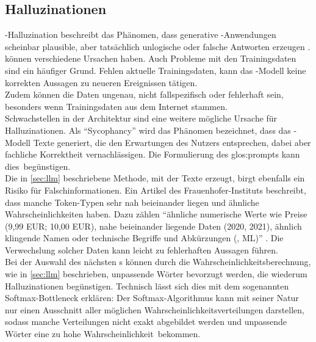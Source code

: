 \documentclass[../main.tex]{subfiles}
\begin{document}
\subsection{Halluzinationen}
 -Halluzination beschreibt 
das Phänomen, dass generative -Anwendungen scheinbar plausible, aber tatsächlich unlogische oder falsche Antworten erzeugen \cite{hallucinationForewarning}.\\
 können verschiedene Ursachen haben. Auch Probleme mit den Trainingsdaten sind ein häufiger Grund. Fehlen aktuelle Trainingsdaten, kann das -Modell keine korrekten Aussagen zu neueren Ereignissen tätigen.\\ 
Zudem können die Daten ungenau, nicht fallspezifisch oder fehlerhaft sein, besonders wenn Trainingsdaten aus dem Internet stammen.\\ 
Schwachstellen in der Architektur sind eine weitere mögliche Ursache für Halluzinationen. Als "`Sycophancy"' wird das Phänomen bezeichnet, dass das -Modell Texte 
generiert, die den Erwartungen des Nutzers entsprechen, dabei aber fachliche Korrektheit vernachlässigen. Die Formulierung des \gls{glos:prompt}s kann \mbox{dies begünstigen. \cite{allgemHalluzinationen}} \\
Die in \autoref{sec:llm} beschriebene Methode, mit der  Texte erzeugt, birgt ebenfalls ein Risiko für Falschinformationen. Ein Artikel des Frauenhofer-Instituts beschreibt, dass manche Token-Typen sehr nah beieinander liegen 
und ähnliche Wahrscheinlichkeiten haben. Dazu zählen "`ähnliche numerische Werte wie Preise (9,99 EUR; 10,00 EUR), nahe beieinander liegende Daten (2020, 2021), ähnlich klingende Namen oder 
technische Begriffe und Abkürzungen (, ML)"' \cite{halluzinationenFraunhofer}. Die Verwechslung solcher Daten kann leicht zu fehlerhaften Aussagen führen.\\
Bei der Auswahl des nächsten s können durch die Wahrscheinlichkeitsberechnung, wie in \autoref{sec:llm}  beschrieben, unpassende Wörter bevorzugt werden, die wiederum Halluzinationen 
begünstigen. Technisch lässt sich dies mit dem sogenannten Softmax-Bottleneck erklären: Der Softmax-Algorithmus kann mit seiner Natur nur einen Ausschnitt aller möglichen 
Wahrscheinlichkeitsverteilungen darstellen, sodass manche Verteilungen nicht exakt abgebildet werden und unpassende Wörter eine zu hohe \mbox{Wahrscheinlichkeit bekommen. \cite{softmax}} \\
\end{document}
